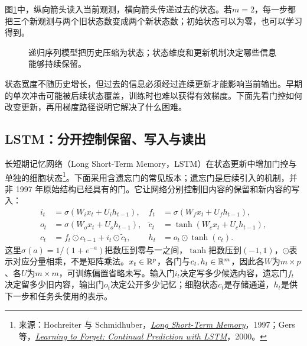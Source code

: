 图\ref{fig:sequence-recurrent-state}中，纵向箭头读入当前观测，横向箭头传递过去的状态。若$m=2$，每一步都把三个新观测与两个旧状态数变成两个新状态数；初始状态可以为零，也可以学习得到。

\begin{figure}[htbp]
\centering
{}
\caption{递归序列模型把历史压缩为状态；状态维度和更新机制决定哪些信息能够持续保留。}
\label{fig:sequence-recurrent-state}
\end{figure}
状态宽度不随历史增长，但过去的信息必须经过连续更新才能影响当前输出。早期的单次冲击可能被后续状态覆盖，训练时也难以获得有效梯度。下面先看门控如何改变更新，再用梯度路径说明它解决了什么困难。

\subsection{LSTM：分开控制保留、写入与读出}
长短期记忆网络（Long Short-Term Memory，LSTM）在状态更新中增加门控与单独的细胞状态\footnote{来源：Hochreiter 与 Schmidhuber，\href{https://doi.org/10.1162/neco.1997.9.8.1735}{\textit{Long Short-Term Memory}}，1997；Gers 等，\href{https://doi.org/10.1162/089976600300015015}{\textit{Learning to Forget: Continual Prediction with LSTM}}，2000。}。下面采用含遗忘门的常见版本；遗忘门是后续引入的机制，并非 1997 年原始结构已经具有的门。它让网络分别控制旧内容的保留和新内容的写入：
\begin{align}
 i_t&=\sigma(W_ix_t+U_ih_{t-1}),& f_t&=\sigma(W_fx_t+U_fh_{t-1}),\label{eq:sequence-lstm-input-forget}\\
 o_t&=\sigma(W_ox_t+U_oh_{t-1}),& \tilde c_t&=\tanh(W_cx_t+U_ch_{t-1}),\label{eq:sequence-lstm-output-candidate}\\
 c_t&=f_t\odot c_{t-1}+i_t\odot\tilde c_t,& h_t&=o_t\odot\tanh(c_t).
\end{align}
这里$\sigma(a)=1/(1+e^{-a})$把数压到零与一之间，$\tanh$把数压到$(-1,1)$，$\odot$表示对应分量相乘，不是矩阵乘法。$x_t\in\mathbb{R}^p$，各门与$c_t,h_t\in\mathbb{R}^m$，因此各$W$为$m\times p$、各$U$为$m\times m$，可训练偏置省略未写。输入门$i_t$决定写多少候选内容，遗忘门$f_t$决定留多少旧内容，输出门$o_t$决定公开多少记忆；细胞状态$c_t$是存储通道，$h_t$是供下一步和任务头使用的表示。

